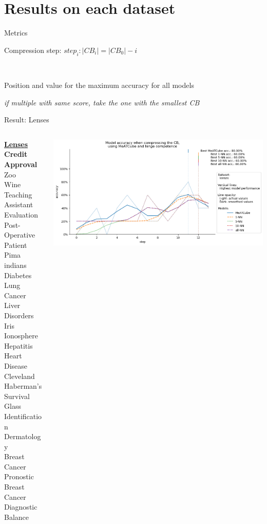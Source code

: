 \documentclass[]{beamer}
\begin{document}
\section{Results on each dataset}

\begin{frame}{Metrics}

    Compression step: $step_i: |CB_i| = |CB_0| - i$

    ~

    Position and value for the maximum accuracy for all models
    
    \textit{if multiple with same score, take the one with the smallest CB}
\end{frame}

\begin{frame}{Result: Lenses}
    \begin{columns}
        \begin{column}{.3\textwidth}
            {\smaller\smaller\smaller
            \underline{\textbf{Lenses}} \\
            \textbf{Credit Approval} \\
            Zoo \\
            Wine \\
            Teaching Assistant Evaluation \\
            Post-Operative Patient \\
            Pima indians Diabetes \\
            Lung Cancer \\
            Liver Disorders \\
            Iris \\
            Ionosphere \\
            Hepatitis \\
            Heart Disease Cleveland \\
            Haberman's Survival \\
            Glass Identification \\
            Dermatology \\
            Breast Cancer Pronostic \\
            Breast Cancer Diagnostic \\
            Balance\\
            ~}
        \end{column}
        \begin{column}{.7\textwidth}
            \includegraphics[width=\textwidth]{../results-no-sim-tuning+/figs/lenses}

\end{column}
\end{columns}
\end{frame}
\end{document}
